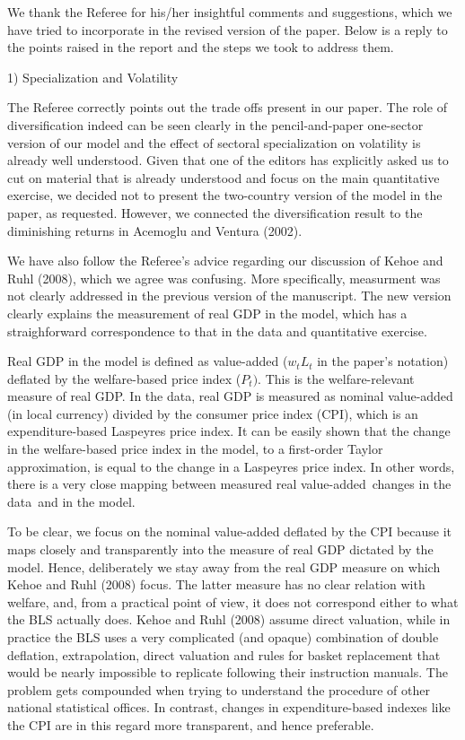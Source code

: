 \documentclass[12pt]{article}
\begin{document}
We thank the Referee for his/her insightful comments and suggestions, which
we have tried to incorporate in the revised version of the paper. Below is a
reply to the points raised in the report and the steps we took to address
them.

\bigskip

1) Specialization and Volatility

The Referee correctly points out the trade offs present in our paper. The
role of diversification indeed can be seen clearly in the pencil-and-paper
one-sector version of our model and the effect of sectoral specialization on
volatility is already well understood. Given that one of the editors has
explicitly asked us to cut on material that is already understood and focus
on the main quantitative exercise, we decided not to present the two-country
version of the model in the paper, as requested. However, we connected the
diversification result to the diminishing returns in Acemoglu and Ventura
(2002). 

We have also follow the Referee's advice regarding our discussion of Kehoe
and Ruhl (2008), which we agree was confusing. More specifically, measurment
was not clearly addressed in the previous version of the manuscript. The new
version clearly explains the measurement of real GDP in the model, which has
a straighforward correspondence to that in the data and quantitative
exercise.

Real GDP in the model is defined as value-added ($w_{t}L_{t}$ in the paper's
notation) deflated by the welfare-based price index ($P_{t})$. This is the
welfare-relevant measure of real GDP. In the data, real GDP is measured as
nominal value-added (in local currency) divided by the consumer price index
(CPI), which is an expenditure-based Laspeyres price index. It can be easily
shown that the change in the welfare-based price index in the model, to a
first-order Taylor approximation, is equal to the change in a Laspeyres
price index. In other words, there is a very close mapping between measured
real value-added\ changes in the data\ and in the model.

To be clear, we focus on the nominal value-added deflated by the CPI because
it maps closely and transparently into the measure of real GDP dictated by
the model. Hence, deliberately we stay away from the real GDP measure on
which Kehoe and Ruhl (2008) focus. The latter measure has no clear relation
with welfare, and, from a practical point of view, it does not correspond
either to what the BLS actually does. Kehoe and Ruhl (2008) assume direct
valuation, while in practice the BLS uses a very complicated (and opaque)
combination of double deflation, extrapolation, direct valuation and rules
for basket replacement that would be nearly impossible to replicate
following their instruction manuals. The problem gets compounded when trying
to understand the procedure of other national statistical offices. In
contrast, changes in expenditure-based indexes like the CPI are in this
regard more transparent, and hence preferable.
\end{document}
